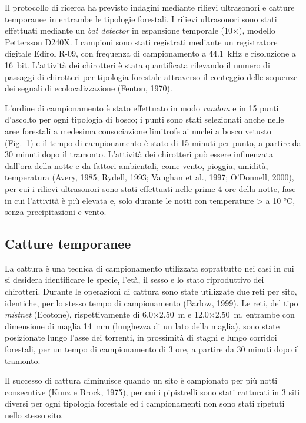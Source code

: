 \begin{multicols}{2}
Il protocollo di ricerca ha previsto indagini mediante rilievi ultrasonori e catture temporanee in entrambe le tipologie forestali. I rilievi ultrasonori sono stati effettuati mediante un \textit{bat detector} in espansione temporale (10$\times$), modello Pettersson D240X. I campioni sono stati registrati mediante un registratore digitale Edirol R-09, con frequenza di campionamento a 44.1~kHz e risoluzione a 16~bit. L’attività dei chirotteri è stata quantificata rilevando il numero di passaggi di chirotteri per tipologia forestale attraverso il conteggio delle sequenze dei segnali di ecolocalizzazione (Fenton, 1970).

L’ordine di campionamento è stato effettuato in modo \textit{random} e in 15 punti d’ascolto per ogni tipologia di bosco; i punti sono stati selezionati anche nelle aree forestali a medesima consociazione limitrofe ai nuclei a bosco vetusto (Fig.~1) e il tempo di campionamento è stato di 15 minuti per punto, a partire da 30 minuti dopo il tramonto. L’attività dei chirotteri può essere influenzata dall’ora della notte e da fattori ambientali, come vento, pioggia, umidità, temperatura (Avery, 1985; Rydell, 1993; Vaughan et al., 1997; O’Donnell, 2000), per cui i rilievi ultrasonori sono stati effettuati nelle prime 4 ore della notte, fase in cui l’attività è più elevata e, solo durante le notti con temperature > a 10 °C, senza precipitazioni e vento. 

\subsection*{Catture temporanee}
La cattura è una tecnica di campionamento utilizzata soprattutto nei casi in cui si desidera identificare le specie, l’età, il sesso e lo stato riproduttivo dei chirotteri. Durante le operazioni di cattura sono state utilizzate due reti per sito, identiche, per lo stesso tempo di campionamento (Barlow, 1999). Le reti, del tipo \textit{mistnet} (Ecotone), rispettivamente di 6.0$\times$2.50~m e 12.0$\times$2.50~m, entrambe con dimensione di maglia 14~mm (lunghezza di un lato della maglia), sono state posizionate lungo l’asse dei torrenti, in prossimità di stagni e lungo corridoi forestali, per un tempo di campionamento di 3 ore, a partire da 30 minuti dopo il tramonto.

Il successo di cattura diminuisce quando un sito è campionato per più notti consecutive (Kunz e Brock, 1975), per cui i pipistrelli sono stati catturati in 3 siti diversi per ogni tipologia forestale ed i campionamenti non sono stati ripetuti nello stesso sito.
 

\end{multicols}
